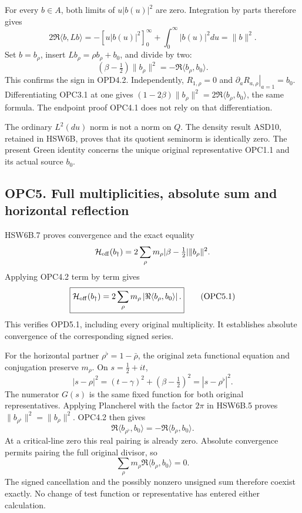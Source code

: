 For every \(b\in A\), both limits of \(u|b(u)|^2\) are zero. Integration
by parts therefore gives \[
2\Re\langle b,Lb\rangle
=-[u|b(u)|^2]_{0}^{\infty}+\int_0^\infty|b(u)|^2du
=\|b\|^2.
\tag{OPC4.1}
\] Set \(b=b_\rho\), insert \(Lb_\rho=\rho b_\rho+b_0\), and divide by
two: \[
\boxed{(\beta-\tfrac12)\|b_\rho\|^2
=-\Re\langle b_\rho,b_0\rangle.}
\tag{OPC4.2}
\] This confirms the sign in OPD4.2. Independently, \(R_{1,\rho}=0\) and
\(\left.\partial_aR_{a,\rho}\right|_{a=1}=b_0\). Differentiating OPC3.1
at one gives \((1-2\beta)\|b_\rho\|^2=2\Re\langle b_\rho,b_0\rangle\),
the same formula. The endpoint proof OPC4.1 does not rely on that
differentiation.

The ordinary \(L^2(du)\) norm is not a norm on \(Q\). The density result
ASD10, retained in HSW6B, proves that its quotient seminorm is
identically zero. The present Green identity concerns the unique
original representative OPC1.1 and its actual source \(b_0\).

\subsection{OPC5. Full multiplicities, absolute sum and horizontal
reflection}\label{opc5.-full-multiplicities-absolute-sum-and-horizontal-reflection}

HSW6B.7 proves convergence and the exact equality \[
\mathcal H_{\rm off}(b_\dagger)
=2\sum_\rho m_\rho|\beta-\tfrac12|\|b_\rho\|^2.
\] Applying OPC4.2 term by term gives \[
\boxed{\mathcal H_{\rm off}(b_\dagger)
=2\sum_\rho m_\rho
\left|\Re\langle b_\rho,b_0\rangle\right|.}
\tag{OPC5.1}
\] This verifies OPD5.1, including every original multiplicity. It
establishes absolute convergence of the corresponding signed series.

For the horizontal partner \(\rho^\flat=1-\bar\rho\), the original zeta
functional equation and conjugation preserve \(m_\rho\). On
\(s=\tfrac12+it\), \[
|s-\rho|^2=(t-\gamma)^2+(\beta-\tfrac12)^2
=|s-\rho^\flat|^2.
\] The numerator \(G(s)\) is the same fixed function for both original
representatives. Applying Plancherel with the factor \(2\pi\) in HSW6B.5
proves \(\|b_{\rho^\flat}\|^2=\|b_\rho\|^2\). OPC4.2 then gives \[
\Re\langle b_{\rho^\flat},b_0\rangle
=-\Re\langle b_\rho,b_0\rangle.
\] At a critical-line zero this real pairing is already zero. Absolute
convergence permits pairing the full original divisor, so \[
\sum_\rho m_\rho\Re\langle b_\rho,b_0\rangle=0.
\tag{OPC5.2}
\] The signed cancellation and the possibly nonzero unsigned sum
therefore coexist exactly. No change of test function or representative
has entered either calculation.

